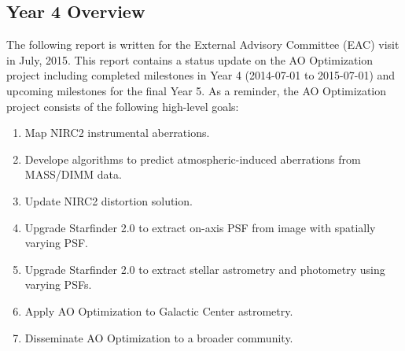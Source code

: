 \subsection{Year 4 Overview}
The following report is written for the External Advisory Committee (EAC) visit in July, 2015. This report contains a status update on the AO Optimization project including completed milestones in Year 4 (2014-07-01 to 2015-07-01) and upcoming milestones for the final Year 5. As a reminder, the AO Optimization project consists of the following high-level goals:
\begin{enumerate}
\item Map NIRC2 instrumental aberrations.
\item Develope algorithms to predict atmospheric-induced aberrations from MASS/DIMM data.
\item Update NIRC2 distortion solution.
\item Upgrade Starfinder 2.0 to extract on-axis PSF from image with spatially varying PSF.
\item Upgrade Starfinder 2.0 to extract stellar astrometry and photometry using varying PSFs.
\item Apply AO Optimization to Galactic Center astrometry.
\item Disseminate AO Optimization to a broader community.
\end{enumerate}




    
    
    
    
    
    
    
  
  
  
  